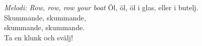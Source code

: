 {\footnotesize\textit{Melodi: Row, row, row your boat}}
\vspace{10pt}
Öl, öl, öl i glas, eller i butelj.\\
Skummande, skummande,\\
skummande, skummande.\\
Ta en klunk och svälj!
